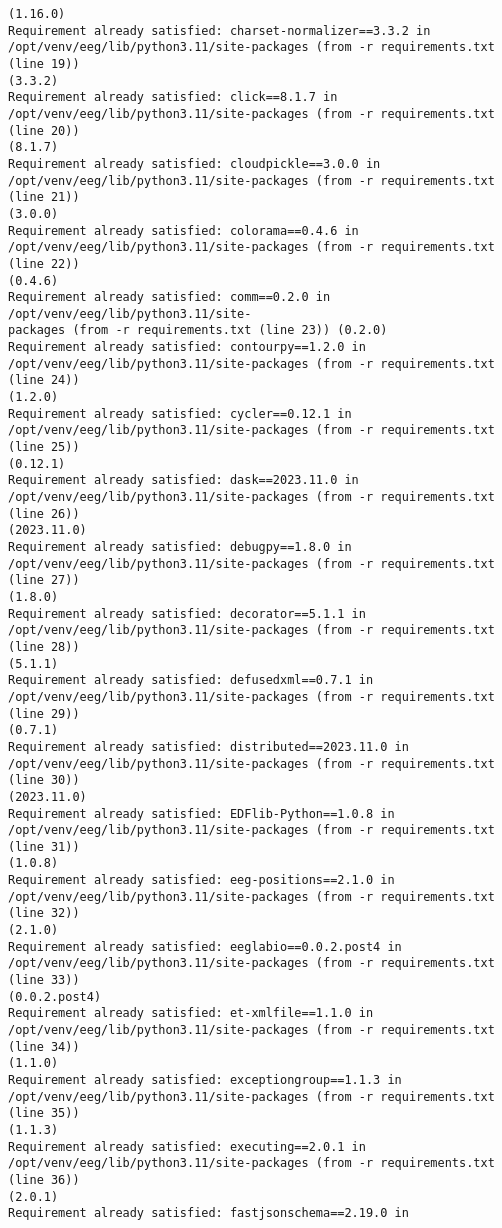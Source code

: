 \documentclass[11pt]{article}
\begin{document}
\begin{Verbatim}[commandchars=\\\{\}]
(1.16.0)
Requirement already satisfied: charset-normalizer==3.3.2 in
/opt/venv/eeg/lib/python3.11/site-packages (from -r requirements.txt (line 19))
(3.3.2)
Requirement already satisfied: click==8.1.7 in
/opt/venv/eeg/lib/python3.11/site-packages (from -r requirements.txt (line 20))
(8.1.7)
Requirement already satisfied: cloudpickle==3.0.0 in
/opt/venv/eeg/lib/python3.11/site-packages (from -r requirements.txt (line 21))
(3.0.0)
Requirement already satisfied: colorama==0.4.6 in
/opt/venv/eeg/lib/python3.11/site-packages (from -r requirements.txt (line 22))
(0.4.6)
Requirement already satisfied: comm==0.2.0 in /opt/venv/eeg/lib/python3.11/site-
packages (from -r requirements.txt (line 23)) (0.2.0)
Requirement already satisfied: contourpy==1.2.0 in
/opt/venv/eeg/lib/python3.11/site-packages (from -r requirements.txt (line 24))
(1.2.0)
Requirement already satisfied: cycler==0.12.1 in
/opt/venv/eeg/lib/python3.11/site-packages (from -r requirements.txt (line 25))
(0.12.1)
Requirement already satisfied: dask==2023.11.0 in
/opt/venv/eeg/lib/python3.11/site-packages (from -r requirements.txt (line 26))
(2023.11.0)
Requirement already satisfied: debugpy==1.8.0 in
/opt/venv/eeg/lib/python3.11/site-packages (from -r requirements.txt (line 27))
(1.8.0)
Requirement already satisfied: decorator==5.1.1 in
/opt/venv/eeg/lib/python3.11/site-packages (from -r requirements.txt (line 28))
(5.1.1)
Requirement already satisfied: defusedxml==0.7.1 in
/opt/venv/eeg/lib/python3.11/site-packages (from -r requirements.txt (line 29))
(0.7.1)
Requirement already satisfied: distributed==2023.11.0 in
/opt/venv/eeg/lib/python3.11/site-packages (from -r requirements.txt (line 30))
(2023.11.0)
Requirement already satisfied: EDFlib-Python==1.0.8 in
/opt/venv/eeg/lib/python3.11/site-packages (from -r requirements.txt (line 31))
(1.0.8)
Requirement already satisfied: eeg-positions==2.1.0 in
/opt/venv/eeg/lib/python3.11/site-packages (from -r requirements.txt (line 32))
(2.1.0)
Requirement already satisfied: eeglabio==0.0.2.post4 in
/opt/venv/eeg/lib/python3.11/site-packages (from -r requirements.txt (line 33))
(0.0.2.post4)
Requirement already satisfied: et-xmlfile==1.1.0 in
/opt/venv/eeg/lib/python3.11/site-packages (from -r requirements.txt (line 34))
(1.1.0)
Requirement already satisfied: exceptiongroup==1.1.3 in
/opt/venv/eeg/lib/python3.11/site-packages (from -r requirements.txt (line 35))
(1.1.3)
Requirement already satisfied: executing==2.0.1 in
/opt/venv/eeg/lib/python3.11/site-packages (from -r requirements.txt (line 36))
(2.0.1)
Requirement already satisfied: fastjsonschema==2.19.0 in

\end{Verbatim}
\end{document}
